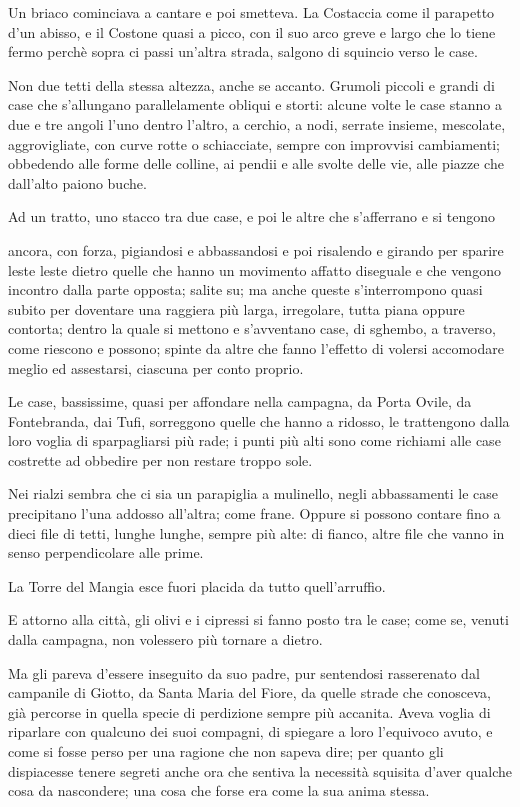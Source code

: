 Un briaco cominciava a cantare e poi smetteva. La Costaccia come il parapetto d'un abisso, e il Costone quasi a picco, con il suo arco greve e largo che lo tiene fermo perchè sopra ci passi un'altra strada, salgono di squincio verso le case.

Non due tetti della stessa altezza, anche se accanto. Grumoli piccoli e grandi di case che s'allungano parallelamente obliqui e storti: alcune volte le case stanno a due e tre angoli l'uno dentro l'altro, a cerchio, a nodi, serrate insieme, mescolate, aggrovigliate, con curve rotte o schiacciate, sempre con improvvisi cambiamenti; obbedendo alle forme delle colline, ai pendii e alle svolte delle vie, alle piazze che dall'alto paiono buche.

Ad un tratto, uno stacco tra due case, e poi le altre che s'afferrano e si tengono

ancora, con forza, pigiandosi e abbassandosi e poi risalendo e girando per sparire leste leste dietro quelle che hanno un movimento affatto diseguale e che vengono incontro dalla parte opposta; salite su; ma anche queste s'interrompono quasi subito per doventare una raggiera più larga, irregolare, tutta piana oppure contorta; dentro la quale si mettono e s'avventano case, di sghembo, a traverso, come riescono e possono; spinte da altre che fanno l'effetto di volersi accomodare meglio ed assestarsi, ciascuna per conto proprio.

Le case, bassissime, quasi per affondare nella campagna, da Porta Ovile, da Fontebranda, dai Tufi, sorreggono quelle che hanno a ridosso, le trattengono dalla loro voglia di sparpagliarsi più rade; i punti più alti sono come richiami alle case costrette ad obbedire per non restare troppo sole.

Nei rialzi sembra che ci sia un parapiglia a mulinello, negli abbassamenti le case precipitano l'una addosso all'altra; come frane. Oppure si possono contare fino a dieci file di tetti, lunghe lunghe, sempre più alte: di fianco, altre file che vanno in senso perpendicolare alle prime.

La Torre del Mangia esce fuori placida da tutto quell'arruffio.

E attorno alla città, gli olivi e i cipressi si fanno posto tra le case; come se, venuti dalla campagna, non volessero più tornare a dietro.

Ma gli pareva d'essere inseguito da suo padre, pur sentendosi rasserenato dal campanile di Giotto, da Santa Maria del Fiore, da quelle strade che conosceva, già percorse in quella specie di perdizione sempre più accanita. Aveva voglia di riparlare con qualcuno dei suoi compagni, di spiegare a loro l'equivoco avuto, e come si fosse perso per una ragione che non sapeva dire; per quanto gli dispiacesse tenere segreti anche ora che sentiva la necessità squisita d'aver qualche cosa da nascondere; una cosa che forse era come la sua anima stessa.

